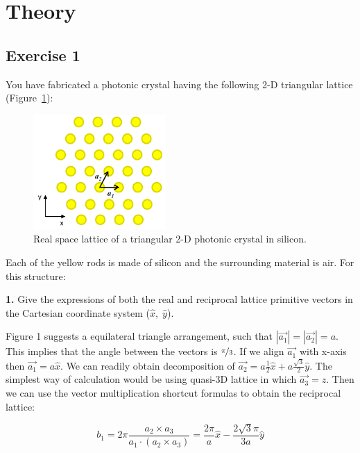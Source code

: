 \documentclass[11pt,a4paper]{article}
\begin{document}
 

\section{Theory}
\subsection*{Exercise 1}
You have fabricated a photonic crystal having the following 2-D triangular lattice (Figure~\ref{fig:fig0}):

\begin{figure}[ht]
   \centering
    \includegraphics[width=0.45\textwidth]{fig0.png}
    \caption{Real space lattice of a triangular 2-D photonic crystal in silicon.}
    \label{fig:fig0}
\end{figure}


Each of the yellow rods is made of silicon and the surrounding material is air. For this structure:

\begin{displayquote}
\textbf{1.} Give the expressions of both the real and reciprocal lattice primitive vectors in the Cartesian coordinate system ($\hat{x}, \; \hat{y}$).
\end{displayquote}

Figure 1 suggests a equilateral triangle arrangement, such that $|\vec{a_1}|=|\vec{a_2}|=a$. This implies that the angle between the vectors is $\nicefrac{\pi}{3}$. If we align $\vec{a_1}$ with x-axis then $\vec{a_1}=a\hat{x}$. We can readily obtain decomposition of $\vec{a_2}=a\frac{1}{2}\hat{x}+a\frac{\sqrt{3}}{2}\hat{y}$. The simplest way of calculation would be using quasi-3D lattice in which $\vec{a_3}=\hat{z}$.  Then we can use the vector multiplication shortcut formulas to obtain the reciprocal lattice:

\begin{equation*}
    b_1=2\pi \frac{a_2\times a_3}{a_1 \cdot(a_2 \times a_3)}= \frac{2 \pi}{a} \hat{x} -\frac{2\sqrt{3}\pi}{3a} \hat{y} 
\end{equation*}
\end{document}
